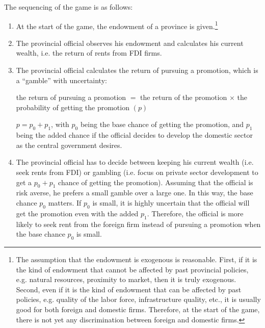The sequencing of the game is as follows:
\begin{enumerate}
\item At the start of the game, the endowment of a province is given.\footnote{The assumption that the endowment is exogenous is reasonable. First, if it is the kind of endowment that cannot be affected by past provincial policies, e.g. natural resources, proximity to market, then it is truly exogenous. Second, even if it is the kind of endowment that can be affected by past policies, e.g. quality of the labor force, infrastructure quality, etc., it is usually good for both foreign and domestic firms. Therefore, at the start of the game, there is not yet any discrimination between foreign and domestic firms.}
\item The provincial official observes his endowment and calculates his current wealth, i.e. the return of rents from FDI firms.
\item The provincial official calculates the return of pursuing a promotion, which is a ``gamble'' with uncertainty:

the return of pursuing a promotion $=$ the return of the promotion $\times$ the probability of getting the promotion $(p)$

$p = p_0 + p_1$, with $p_0$ being the base chance of getting the promotion, and $p_1$ being the added chance if the official decides to develop the domestic sector as the central government desires.

\item The provincial official has to decide between keeping his current wealth (i.e. seek rents from FDI) or gambling (i.e. focus on private sector development to get a $p_0 + p_1$ chance of getting the promotion). Assuming that the official is risk averse, he prefers a small gamble over a large one. In this way, the base chance $p_0$ matters. If $p_0$ is small, it is highly uncertain that the official will get the promotion even with the added $p_1$. Therefore, the official is more likely to seek rent from the foreign firm instead of pursuing a promotion when the base chance $p_0$ is small. 
\end{enumerate}

